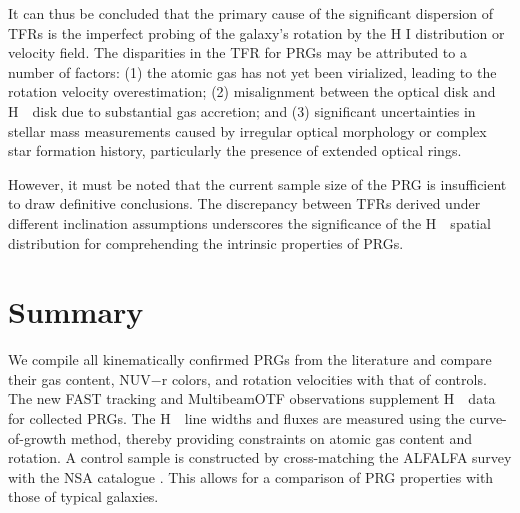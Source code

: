 \documentclass[twocolumn]{aastex631}
\def\HI{H\,  {\textsc{\romannumeral 1}}}
\begin{document}
It can thus be concluded that the primary cause of the significant dispersion of TFRs is the imperfect probing of the galaxy's rotation by the H I distribution or velocity field. The disparities in the TFR for PRGs may be attributed to a number of factors: (1) the atomic gas has not yet been virialized, leading to the rotation velocity overestimation; (2) misalignment between the optical disk and \HI\ disk due to substantial gas accretion; and (3) significant uncertainties in stellar mass measurements caused by irregular optical morphology or complex star formation history, particularly the presence of extended optical rings. 

However, it must be noted that the current sample size of the PRG is insufficient to draw definitive conclusions. The discrepancy between TFRs derived under different inclination assumptions underscores the significance of the \HI\ spatial distribution for comprehending the intrinsic properties of PRGs.


\section{Summary}
\label{sec:sum}
We compile all kinematically confirmed PRGs from the literature and compare their gas content, NUV$-$r colors, and rotation velocities with that of controls. The new FAST tracking and MultibeamOTF observations supplement \HI\ data for collected PRGs. The \HI\ line widths and fluxes are measured using the curve-of-growth method, thereby providing constraints on atomic gas content and rotation. A control sample is constructed by cross-matching the ALFALFA survey \citep{Haynes2011AJ....142..170H, Haynes2018ApJ...861...49H} with the NSA catalogue \citep{Blanton2011AJ....142...31B}. This allows for a comparison of PRG properties with those of typical galaxies.
\end{document}
